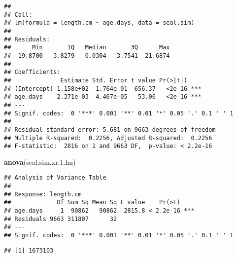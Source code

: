 \documentclass[]{article}
\newenvironment{Shaded}{\begin{snugshade}}{\end{snugshade}}
\newcommand{\KeywordTok}[1]{\textcolor[rgb]{0.13,0.29,0.53}{\textbf{#1}}}
\newcommand{\DataTypeTok}[1]{\textcolor[rgb]{0.13,0.29,0.53}{#1}}
\newcommand{\DecValTok}[1]{\textcolor[rgb]{0.00,0.00,0.81}{#1}}
\newcommand{\FloatTok}[1]{\textcolor[rgb]{0.00,0.00,0.81}{#1}}
\newcommand{\StringTok}[1]{\textcolor[rgb]{0.31,0.60,0.02}{#1}}
\newcommand{\OperatorTok}[1]{\textcolor[rgb]{0.81,0.36,0.00}{\textbf{#1}}}
\newcommand{\NormalTok}[1]{#1}
\begin{document}
\begin{verbatim}
## 
## Call:
## lm(formula = length.cm ~ age.days, data = seal.sim)
## 
## Residuals:
##      Min       1Q   Median       3Q      Max 
## -19.8700  -3.8279   0.0304   3.7541  21.6874 
## 
## Coefficients:
##              Estimate Std. Error t value Pr(>|t|)    
## (Intercept) 1.158e+02  1.764e-01  656.37   <2e-16 ***
## age.days    2.371e-03  4.467e-05   53.06   <2e-16 ***
## ---
## Signif. codes:  0 '***' 0.001 '**' 0.01 '*' 0.05 '.' 0.1 ' ' 1
## 
## Residual standard error: 5.681 on 9663 degrees of freedom
## Multiple R-squared:  0.2256, Adjusted R-squared:  0.2256 
## F-statistic:  2816 on 1 and 9663 DF,  p-value: < 2.2e-16
\end{verbatim}

\begin{Shaded}
\begin{Highlighting}[]
\KeywordTok{anova}\NormalTok{(seal.sim.xr.}\FloatTok{1.}\NormalTok{lm)}
\end{Highlighting}
\end{Shaded}

\begin{verbatim}
## Analysis of Variance Table
## 
## Response: length.cm
##             Df Sum Sq Mean Sq F value    Pr(>F)    
## age.days     1  90862   90862  2815.8 < 2.2e-16 ***
## Residuals 9663 311807      32                      
## ---
## Signif. codes:  0 '***' 0.001 '**' 0.01 '*' 0.05 '.' 0.1 ' ' 1
\end{verbatim}

\begin{Shaded}
\end{Shaded}

\begin{verbatim}
## [1] 1673103
\end{verbatim}

\begin{Shaded}
\end{Shaded}
\end{document}

